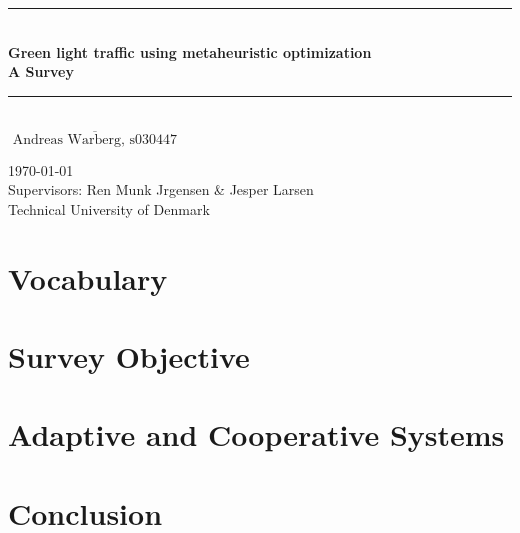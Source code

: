 \documentclass [a4paper, 11pt, titlepage] {article}
\date{A date}
\begin{document}
\setlength{\parindent}{4mm}

\begin{titlepage}
  \begin{center}
    \noindent\rule{\linewidth}{1mm}\\[4mm]
      {\sffamily\bfseries \Huge Green light traffic using metaheuristic optimization}\\[1mm]
      {\sffamily\bfseries \Large
        A Survey}\\[0mm]
    \noindent\rule{\linewidth}{1mm}\\[30mm]
    \large $\overline{\textrm{ Andreas Warberg, s030447 }}$


    \large \today \\[6mm]
    Supervisors: Ren Munk Jrgensen \& Jesper Larsen \\[3mm]
    Technical University of Denmark
  \end{center}
\end{titlepage}

\newpage
{}
\tableofcontents
\newpage
{}



\newpage

\section{Vocabulary}


\section{Survey Objective}





\section{Adaptive and Cooperative Systems}


\clearpage
\pagebreak
\section{Conclusion}


\clearpage
\newpage





\clearpage
\newpage
\appendix
\end{document}
